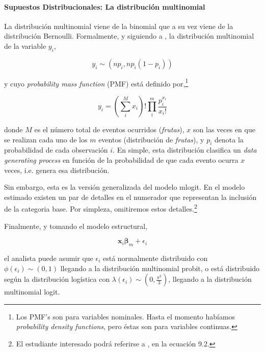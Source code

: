 \documentclass[onesided]{article}\usepackage[]{graphicx}\usepackage[]{color}
\begin{document}
\paragraph{Supuestos Distribucionales: La distribuci\'on multinomial} 

La distribuci\'on multinomial viene de la binomial que a su vez viene de la distribuci\'on Bernoulli. Formalmente, y siguiendo a \textcite[162]{Ward2018}, la distribuci\'on multinomial de la variable $y_{i}$,

\begin{equation}
y_{i} \sim (np_{i}, np_{i}(1-p_{i}))
\end{equation}

y cuyo \emph{probability mass function} (PMF) est\'a definido por,\footnote{Los PMF's son para variables nominales. Hasta el momento hab\'iamos \emph{probability density functions}, pero \'estas son para variables continuas.}


\begin{equation}\label{pmf.mlogit}
y_{i} = (\sum_{i}^{M}x_{i})!\prod_{i}^{m}\frac{p_{i}^{x_{i}}}{x_{i}!}
\end{equation}

donde $M$ es el n\'umero total de eventos ocurridos (\emph{frutas}), $x$ son las veces en que se realizan cada uno de los $m$ eventos (distribuci\'on de \emph{frutas}), y $p_{i}$ denota la probabilidad de cada observaci\'on $i$. En simple, esta distribuci\'on clasifica un \emph{data generating process} en funci\'on de la probabilidad de que cada evento ocurra $x$ veces, i.e. genera esa distribuci\'on.

Sin embargo, esta es la versi\'on generalizada del modelo mlogit. En el modelo estimado existen un par de detalles en el numerador que representan la inclusi\'on de la categoria base. Por simpleza, omitiremos estos detalles.\footnote{El estudiante interesado podr\'a referirse a \textcite{Ward2018}, en la ecuaci\'on 9.2.}

Finalmente, y tomando el modelo estructural,

\begin{equation}\label{m.structural}
\boldsymbol{x}_{i}\boldsymbol{\beta}_{m} + \epsilon_{i}
\end{equation}

el analista puede asumir que $\epsilon_{i}$ est\'a normalmente distribuido con $\phi(\epsilon_{i})\sim(0,1)$ llegando a la distribuci\'on multinomial probit, o est\'a distribuido seg\'un la distribuci\'on log\'istica con $\lambda(\epsilon_{i})\sim(0,\frac{\pi^{2}}{3})$, llegando a la distribuci\'on multinomial logit.
\end{document}
